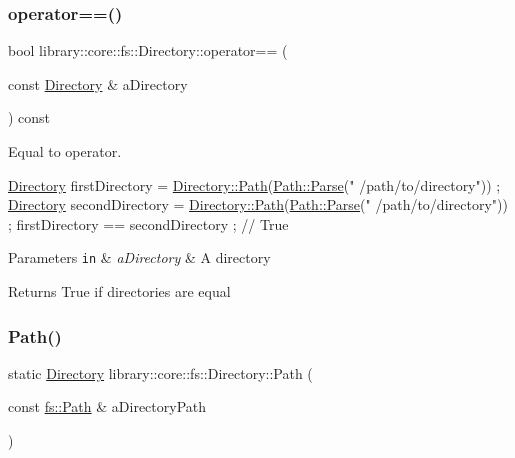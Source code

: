 \subsubsection{\texorpdfstring{operator==()}{operator==()}}
{\footnotesize\ttfamily bool library\+::core\+::fs\+::\+Directory\+::operator== (\begin{DoxyParamCaption}\item[{const \hyperlink{classlibrary_1_1core_1_1fs_1_1_directory}{Directory} \&}]{a\+Directory }\end{DoxyParamCaption}) const}



Equal to operator. 


\begin{DoxyCode}
\hyperlink{classlibrary_1_1core_1_1fs_1_1_directory_a3ec39f6cad19a81d520e9a1f2d8bb1f7}{Directory} firstDirectory = \hyperlink{classlibrary_1_1core_1_1fs_1_1_directory_a6d3ea04654841e62a4dbd99feb563caf}{Directory::Path}(\hyperlink{classlibrary_1_1core_1_1fs_1_1_path_a6ba644b6609507e724c217bf2020f5ae}{Path::Parse}(\textcolor{stringliteral}{"
      /path/to/directory"})) ;
\hyperlink{classlibrary_1_1core_1_1fs_1_1_directory_a3ec39f6cad19a81d520e9a1f2d8bb1f7}{Directory} secondDirectory = \hyperlink{classlibrary_1_1core_1_1fs_1_1_directory_a6d3ea04654841e62a4dbd99feb563caf}{Directory::Path}(\hyperlink{classlibrary_1_1core_1_1fs_1_1_path_a6ba644b6609507e724c217bf2020f5ae}{Path::Parse}(\textcolor{stringliteral}{"
      /path/to/directory"})) ;
firstDirectory == secondDirectory ; \textcolor{comment}{// True}
\end{DoxyCode}



\begin{DoxyParams}[1]{Parameters}
\mbox{\tt in}  & {\em a\+Directory} & A directory \\
\hline
\end{DoxyParams}
\begin{DoxyReturn}{Returns}
True if directories are equal 
\end{DoxyReturn}
\mbox{\label{classlibrary_1_1core_1_1fs_1_1_directory_a6d3ea04654841e62a4dbd99feb563caf}} 
\subsubsection{\texorpdfstring{Path()}{Path()}}
{\footnotesize\ttfamily static \hyperlink{classlibrary_1_1core_1_1fs_1_1_directory}{Directory} library\+::core\+::fs\+::\+Directory\+::\+Path (\begin{DoxyParamCaption}\item[{const \hyperlink{classlibrary_1_1core_1_1fs_1_1_path}{fs\+::\+Path} \&}]{a\+Directory\+Path }\end{DoxyParamCaption})\hspace{0.3cm}{\ttfamily [static]}}



